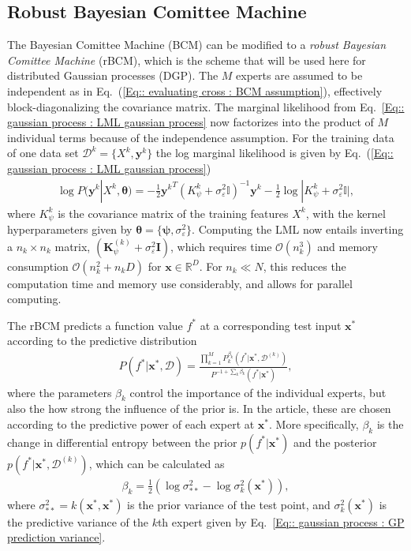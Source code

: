 \documentclass[twoside,english]{uiofysmaster}
\begin{document}
{\subsection{Robust Bayesian Comittee Machine}

The Bayesian Comittee Machine (BCM) can be modified to a \textit{robust Bayesian Comittee Machine} (rBCM), which is the scheme that will be used here for distributed Gaussian processes (DGP). The $M$ experts are assumed to be independent \cite{deisenroth2015distributed} as in Eq.~(\ref{Eq:: evaluating cross : BCM assumption}), effectively block-diagonalizing the covariance matrix. The marginal likelihood from Eq.~\ref{Eq:: gaussian process : LML gaussian process} now factorizes into the product of $M$ individual terms because of the independence assumption. For the training data of one data set $\mathcal{D}^k = \{X^k, \textbf{y}^k \}$ the log marginal likelihood is given by Eq.~(\ref{Eq:: gaussian process : LML gaussian process})
\begin{align}
\log P(\textbf{y}^k|X^k, \boldsymbol{\theta}) = - \frac{1}{2} {\textbf{y}^k}^T (K_{\psi}^k + \sigma_{\varepsilon}^2 \mathbb{I})^{-1}\textbf{y}^k - \frac{1}{2} \log
 |K_{\psi}^k + \sigma_{\varepsilon}^2 \mathbb{I} |,
\end{align}
where $K_{\psi}^k$ is the covariance matrix of the training features $X^k$, with the kernel hyperparameters given by $\boldsymbol{\theta} = \{ \boldsymbol{\psi}, \sigma_{\varepsilon}^2 \}$. Computing the LML now entails inverting a $n_k \times n_k$ matrix, $(\textbf{K}_{\psi}^{(k)} + \sigma_{\varepsilon}^2 \textbf{I})$, which requires time $\mathcal{O}(n_k^3)$ and memory consumption $\mathcal{O}(n_k^2 + n_kD)$ for $\textbf{x} \in \mathbb{R}^D$. For $n_k \ll N$, this reduces the computation time and memory use considerably, and allows for parallel computing. 

The rBCM predicts a function value $f^*$ at a corresponding test input $\textbf{x}^*$ according to the predictive distribution
\begin{align}
P(f^* | \textbf{x}^*, \mathcal{D}) = \frac{\prod_{k=1}^M P_k^{\beta_k} (f^*| \textbf{x}^*, \mathcal{D}^{(k)})}{P^{-1 + \sum_k \beta_k} (f^* | \textbf{x}^*)},
\end{align}
where the parameters $\beta_k$ control the importance of the individual experts, but also the how strong the influence of the prior is. In the article, these are chosen according to the predictive power of each expert at $\textbf{x}^*$. More specifically, $\beta_k$ is the change in differential entropy between the prior $p(f^* | \textbf{x}^*)$ and the posterior $p(f^* | \textbf{x}^*, \mathcal{D}^{(k)})$, which can be calculated as 
\begin{align}
\beta_k = \frac{1}{2} (\log \sigma_{**}^2 - \log \sigma^2_k(\textbf{x}^*) ),
\end{align}
where $\sigma_{**}^2 = k(\textbf{x}^*, \textbf{x}^*)$ is the prior variance of the test point, and $\sigma_k^2 (\textbf{x}^*)$ is the predictive variance of the $k$th expert given by Eq.~\ref{Eq:: gaussian process : GP prediction variance}. 

}
\end{document}
